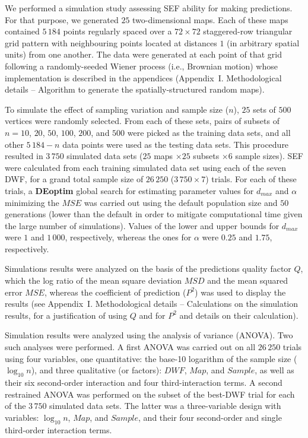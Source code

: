 \documentclass[
]{article}
\begin{document}
We performed a simulation study assessing SEF ability for making
predictions. For that purpose, we generated \(25\) two-dimensional maps.
Each of these maps contained \(5\,184\) points regularly spaced over a
\(72 \times 72\) staggered-row triangular grid pattern with neighbouring
points located at distances \(1\) (in arbitrary spatial units) from one
another. The data were generated at each point of that grid following a
randomly-seeded Wiener process (i.e., Brownian motion) whose
implementation is described in the appendices (Appendix~I.
Methodological details -- Algorithm to generate the spatially-structured
random maps).

To simulate the effect of sampling variation and sample size (\(n\)),
\(25\) sets of \(500\) vertices were randomly selected. From each of
these sets, pairs of subsets of \(n = 10\), \(20\), \(50\), \(100\),
\(200\), and \(500\) were picked as the training data sets, and all
other \(5\,184 - n\) data points were used as the testing data sets.
This procedure resulted in \(3\,750\) simulated data sets (\(25\) maps
\(\times 25\) subsets \(\times 6\) sample sizes). SEF were calculated
from each training simulated data set using each of the seven DWF, for a
grand total sample size of \(26\,250\) (\(3\,750 \times 7\)) trials. For
each of these trials, a \textbf{DEoptim} global search for estimating
parameter values for \(d_{max}\) and \(\alpha\) minimizing the \(MSE\)
was carried out using the default population size and \(50\) generations
(lower than the default in order to mitigate computational time given
the large number of simulations). Values of the lower and upper bounds
for \(d_{max}\) were \(1\) and \(1\,000\), respectively, whereas the
ones for \(\alpha\) were \(0.25\) and \(1.75\), respectively.

Simulations results were analyzed on the basis of the predictions
quality factor \(Q\), which the log ratio of the mean square deviation
\(MSD\) and the mean squared error \(MSE\), whereas the coefficient of
prediction (\(P^2\)) was used to display the results (see Appendix~I.
Methodological details -- Calculations on the simulation results, for a
justification of using \(Q\) and for \(P^2\) and details on their
calculation).

Simulation results were analyzed using the analysis of variance (ANOVA).
Two such analyses were performed. A first ANOVA was carried out on all
\(26\,250\) trials using four variables, one quantitative: the base-10
logarithm of the sample size (\(\log_{10} n\)), and three qualitative
(or factors): \(DWF\), \(Map\), and \(Sample\), as well as their six
second-order interaction and four third-interaction terms. A second
restrained ANOVA was performed on the subset of the best-DWF trial for
each of the \(3\,750\) simulated data sets. The latter was a
three-variable design with variables: \(\log_{10} n\), \(Map\), and
\(Sample\), and their four second-order and single third-order
interaction terms.
\end{document}
